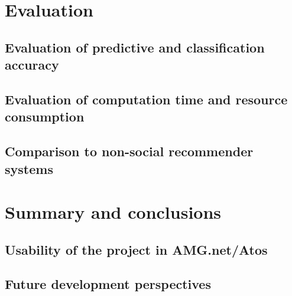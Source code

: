 \documentclass[12pt]{report}
\begin{document}
\chapter{Evaluation}
\section{Evaluation of predictive and classification accuracy}
\section{Evaluation of computation time and resource consumption}
\section{Comparison to non-social recommender systems}

\chapter{Summary and conclusions}
\section{Usability of the project in AMG.net/Atos}
\section{Future development perspectives}


\end{document}
